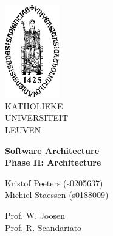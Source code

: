 \thispagestyle{empty}
\begin{flushleft}
\includegraphics[height=40mm]{figs/sedes_2.jpg}\\
\small
KATHOLIEKE\\ UNIVERSITEIT\\ LEUVEN
\end{flushleft}


\begin{center}
\textbf{Software Architecture} \\
\LARGE
\textbf{Phase II: Architecture}
\end{center}


\begin{flushleft}
\small
Kristof Peeters (s0205637)\\
Michiel Staessen (s0188009)
\end{flushleft}

\begin{flushleft}
Prof. W. Joosen \\
Prof. R. Scandariato
\end{flushleft}

